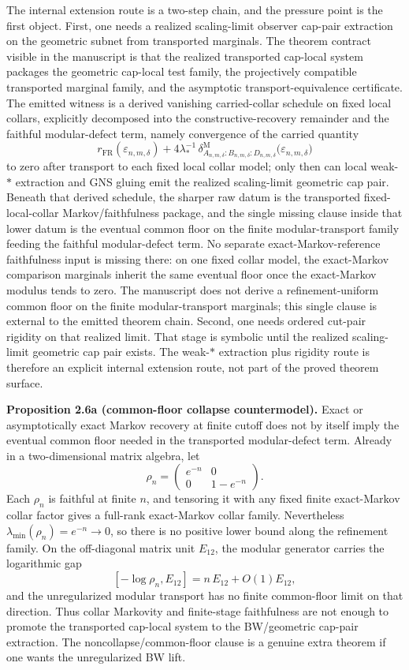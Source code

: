 The internal extension route is a two-step chain, and the pressure point is the first object. First, one needs a realized scaling-limit observer cap-pair extraction on the geometric subnet from transported marginals. The theorem contract visible in the manuscript is that the realized transported cap-local system packages the geometric cap-local test family, the projectively compatible transported marginal family, and the asymptotic transport-equivalence certificate. The emitted witness is a derived vanishing carried-collar schedule on fixed local collars, explicitly decomposed into the constructive-recovery remainder and the faithful modular-defect term, namely convergence of the carried quantity
\[
r_{\mathrm{FR}}(\varepsilon_{n,m,\delta})
+
4\lambda_\ast^{-1}\,
\delta^{\mathrm M}_{A_{n,m,\delta}:B_{n,m,\delta}:D_{n,m,\delta}}
\bigl(\varepsilon_{n,m,\delta}\bigr)
\]
to zero after transport to each fixed local collar model; only then can local weak-\(*\) extraction and GNS gluing emit the realized scaling-limit geometric cap pair. Beneath that derived schedule, the sharper raw datum is the transported fixed-local-collar Markov/faithfulness package, and the single missing clause inside that lower datum is the eventual common floor on the finite modular-transport family feeding the faithful modular-defect term. No separate exact-Markov-reference faithfulness input is missing there: on one fixed collar model, the exact-Markov comparison marginals inherit the same eventual floor once the exact-Markov modulus tends to zero. The manuscript does not derive a refinement-uniform common floor on the finite modular-transport marginals; this single clause is external to the emitted theorem chain. Second, one needs ordered cut-pair rigidity on that realized limit. That stage is symbolic until the realized scaling-limit geometric cap pair exists. The weak-\(*\) extraction plus rigidity route is therefore an explicit internal extension route, not part of the proved theorem surface.

\textbf{Proposition 2.6a (common-floor collapse countermodel).} Exact or asymptotically exact Markov recovery at finite cutoff does not by itself imply the eventual common floor needed in the transported modular-defect term. Already in a two-dimensional matrix algebra, let
\[
\rho_n=\begin{pmatrix}e^{-n}&0\\0&1-e^{-n}\end{pmatrix}.
\]
Each \(\rho_n\) is faithful at finite \(n\), and tensoring it with any fixed finite exact-Markov collar factor gives a full-rank exact-Markov collar family. Nevertheless \(\lambda_{\min}(\rho_n)=e^{-n}\to0\), so there is no positive lower bound along the refinement family. On the off-diagonal matrix unit \(E_{12}\), the modular generator carries the logarithmic gap
\[
[ -\log\rho_n, E_{12} ] = n\,E_{12}+O(1)E_{12},
\]
and the unregularized modular transport has no finite common-floor limit on that direction. Thus collar Markovity and finite-stage faithfulness are not enough to promote the transported cap-local system to the BW/geometric cap-pair extraction. The noncollapse/common-floor clause is a genuine extra theorem if one wants the unregularized BW lift.


